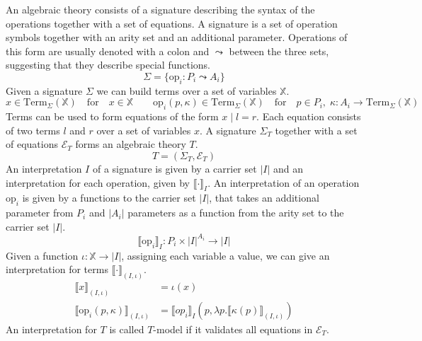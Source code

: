 An algebraic theory consists of a signature describing the syntax of the
operations together with a set of equations.
A signature is a set of operation symbols together with an arity set and an
additional parameter.
Operations of this form are usually denoted with a colon and $\leadsto$
between the three sets, suggesting that they describe special functions.
\[
  \Sigma = \{ \mathrm{op}_i : P_i \leadsto A_i  \}
\]
Given a signature $\Sigma$ we can build terms over a set of variables $\mathbb{X}$.
\[
  x \in \mathrm{Term}_\Sigma(\mathbb{X}) \quad\text{for}\quad x\in\mathbb{X} \qquad
  \mathrm{op}_i(p, \kappa) \in \mathrm{Term}_\Sigma(\mathbb{X}) \quad\text{for}\quad
  p\in P_i,\;\kappa : A_i \rightarrow \mathrm{Term}_\Sigma(\mathbb{X})
\]
Terms can be used to form equations of the form $x\;|\;l=r$.
Each equation consists of two terms $l$ and $r$ over a set of variables $x$.
A signature $\Sigma_T$ together with a set of equations $\mathcal{E}_T$ forms an
algebraic theory $T$.
\[
  T = (\Sigma_T, \mathcal{E}_T)
\]
An interpretation $I$ of a signature is given by a carrier set $|I|$ and an
interpretation for each operation, given by $\lBrack\cdot\rBrack_I$.
An interpretation of an operation $\mathrm{op}_i$ is given by a functions to the
carrier set $|I|$, that takes an additional parameter from $P_i$ and $|A_i|$
parameters as a function from the arity set to the carrier set $|I|$.
\[
  \lBrack \mathrm{op}_i \rBrack_I : P_i \times |I|^{A_i} \rightarrow |I|
\]
Given a function $\iota : \mathbb{X} \rightarrow |I|$, assigning each variable
a value, we can give an interpretation for terms $\lBrack\cdot\rBrack_{(I,\iota)}$.
\begin{align*}
  \lBrack x \rBrack_{(I,\iota)} &= \iota(x) \\
  \lBrack \mathrm{op}_i(p, \kappa)\rBrack_{(I,\iota)} &= \lBrack op_i \rBrack_I (p, \lambda p. \lBrack\kappa(p)\rBrack_{(I, \iota)})
\end{align*}
An interpretation for $T$ is called $T$-model if it validates all equations in $\mathcal{E}_T$.

% 

